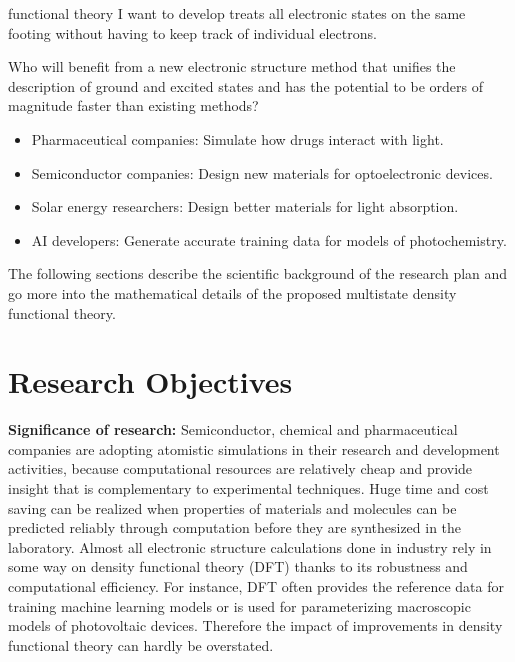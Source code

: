 \documentclass[12pt]{article}
\begin{document}
functional theory I want to develop treats all electronic states on the same footing without having to keep track of individual electrons. 

Who will benefit from a new electronic structure method that unifies the description of ground and excited states and has the potential to be orders of magnitude faster than existing methods?
\begin{itemize}
\item Pharmaceutical companies: Simulate how drugs interact with light.
\item Semiconductor companies: Design new materials for optoelectronic devices.
\item Solar energy researchers: Design better materials for light absorption.
\item AI developers: Generate accurate training data for models of photochemistry.
\end{itemize}


The following sections describe the scientific background of the research plan and go more into the mathematical details of the proposed multistate density functional theory.

\section{Research Objectives}

\noindent\textbf{Significance of research:} Semiconductor, chemical and pharmaceutical companies are adopting atomistic simulations in their research and development activities, because computational resources are relatively cheap and provide insight that is complementary to experimental techniques. Huge time and cost saving can be realized when properties of materials and molecules can be predicted reliably through computation before they are synthesized in the laboratory. Almost all electronic structure calculations done in industry rely in some way on density functional theory  (DFT) thanks to its robustness and computational efficiency. For instance, DFT often provides the reference data for training machine learning models or is used for parameterizing macroscopic models of photovoltaic devices. Therefore the impact of improvements in density functional theory can hardly be overstated.
\end{document}
